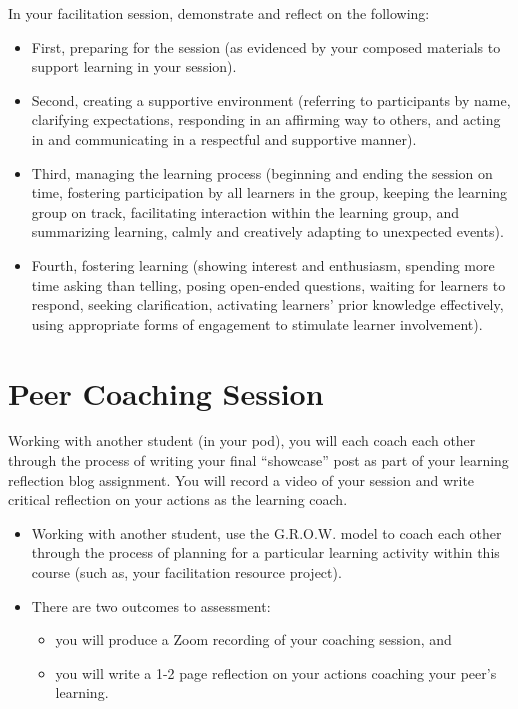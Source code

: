 \documentclass[
]{book}
\providecommand{\tightlist}{%
  \setlength{\itemsep}{0pt}\setlength{\parskip}{0pt}}
\begin{document}
In your facilitation session, demonstrate and reflect on the following:

\begin{itemize}
\tightlist
\item
  First, preparing for the session (as evidenced by your composed materials to support learning in your session).\\
\item
  Second, creating a supportive environment (referring to participants by name, clarifying expectations, responding in an affirming way to others, and acting in and communicating in a respectful and supportive manner).\\
\item
  Third, managing the learning process (beginning and ending the session on time, fostering participation by all learners in the group, keeping the learning group on track, facilitating interaction within the learning group, and summarizing learning, calmly and creatively adapting to unexpected events).\\
\item
  Fourth, fostering learning (showing interest and enthusiasm, spending more time asking than telling, posing open-ended questions, waiting for learners to respond, seeking clarification, activating learners' prior knowledge effectively, using appropriate forms of engagement to stimulate learner involvement).
\end{itemize}

\hypertarget{peer-coaching-session}{%
\section*{Peer Coaching Session}\label{peer-coaching-session}}

Working with another student (in your pod), you will each coach each other through the process of writing your final ``showcase'' post as part of your learning reflection blog assignment. You will record a video of your session and write critical reflection on your actions as the learning coach.

\begin{itemize}
\tightlist
\item
  Working with another student, use the G.R.O.W. model to coach each other through the process of planning for a particular learning activity within this course (such as, your facilitation resource project).
\item
  There are two outcomes to assessment:

  \begin{itemize}
  \tightlist
  \item
    you will produce a Zoom recording of your coaching session, and
  \item
    you will write a 1-2 page reflection on your actions coaching your peer's learning.
  \end{itemize}
\end{itemize}
\end{document}
